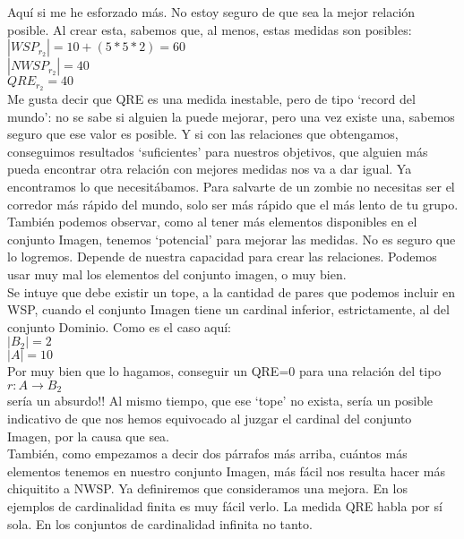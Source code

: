 	\noindent
	Aquí si me he esforzado más. No estoy seguro de que sea la mejor relación posible. Al crear esta, sabemos que, al menos, estas medidas son posibles:\\
	$|WSP_{r_{2}}| = 10+(5*5*2) = 60$\\
	$|NWSP_{r_{2}}| = 40$\\
	$QRE_{r_{2}}=40$
	\\
	
	
	\noindent
	Me gusta decir que QRE es una medida inestable, pero de tipo `record del mundo': no se sabe si alguien la puede mejorar, pero una vez existe una, sabemos seguro que ese valor es posible. Y si con las relaciones que obtengamos, conseguimos resultados `suficientes' para nuestros objetivos, que alguien más pueda encontrar otra relación con mejores medidas nos va a dar igual. Ya encontramos lo que necesitábamos. Para salvarte de un zombie no necesitas ser el corredor más rápido del mundo, solo ser más rápido que el más lento de tu grupo.
	\\
	
	\noindent
	También podemos observar, como al tener más elementos disponibles en el conjunto Imagen, tenemos `potencial' para mejorar las medidas. No es seguro que lo logremos. Depende de nuestra capacidad para crear las relaciones. Podemos usar muy mal los elementos del conjunto imagen, o muy bien. 
	\\
	
	\noindent
	Se intuye que debe existir un tope, a la cantidad de pares que podemos incluir en WSP, cuando el conjunto Imagen tiene un cardinal inferior, estrictamente, al del conjunto Dominio. Como es el caso aquí:\\ 
	$|B_{2}|=2$\\ 
	$|A|=10$\\
	Por muy bien que lo hagamos, conseguir un QRE=0 para una relación del tipo\\
	$r:A \longrightarrow B_{2}$\\
	sería un absurdo!! Al mismo tiempo, que ese `tope' no exista, sería un posible indicativo de que nos hemos equivocado al juzgar el cardinal del conjunto Imagen, por la causa que sea.
	\\
	
	\noindent
	También, como empezamos a decir dos párrafos más arriba, cuántos más elementos tenemos en nuestro conjunto Imagen, más fácil nos resulta hacer más chiquitito a NWSP. Ya definiremos que consideramos una mejora. En los ejemplos de cardinalidad finita es muy fácil verlo. La medida QRE habla por sí sola. En los conjuntos de cardinalidad infinita no tanto.
	\\
	
